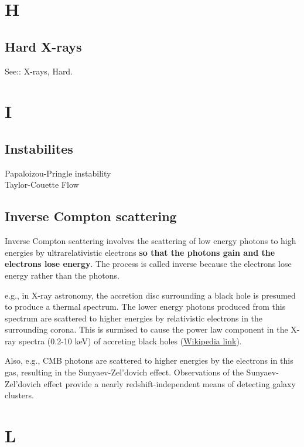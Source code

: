 \documentclass[11pt]{article}
\begin{document}
\section*{H}
    \subsection*{Hard X-rays}
    See:: X-rays, Hard. 

\section*{I}
    \subsection*{Instabilites}
    Papaloizou-Pringle instability\\
    Taylor-Couette Flow\\

    \subsection*{Inverse Compton scattering}
    Inverse Compton scattering involves the scattering of low energy
    photons to high energies by ultrarelativistic electrons {\bf so that
      the photons gain and the electrons lose energy}. The process is called
    inverse because the electrons lose energy rather than the photons.

    e.g., in X-ray astronomy, the accretion disc surrounding a black
    hole is presumed to produce a thermal spectrum. The lower energy
    photons produced from this spectrum are scattered to higher energies
    by relativistic electrons in the surrounding corona. This is surmised
    to cause the power law component in the X-ray spectra (0.2-10 keV) of
    accreting black holes (\href{https://en.wikipedia.org/wiki/Compton\_scattering}{Wikipedia link}).

    Also, e.g., CMB photons are scattered to higher energies by the
    electrons in this gas, resulting in the Sunyaev-Zel'dovich
    effect. Observations of the Sunyaev-Zel'dovich effect provide a nearly
    redshift-independent means of detecting galaxy clusters.


\section*{L}
\end{document}
